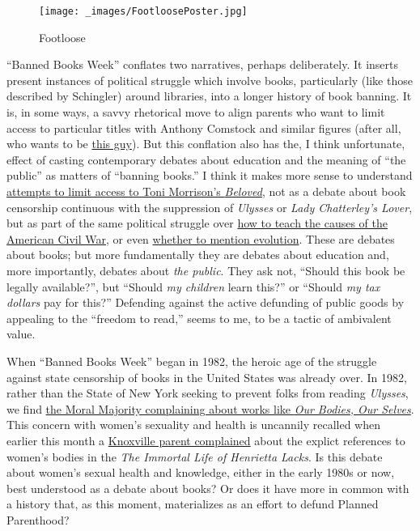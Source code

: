 \documentclass[
  12pt,
]{article}
\begin{document}
\par\begin{figure}\centering\texttt{[image: \_images/FootloosePoster.jpg]}\caption{Footloose}\end{figure}

``Banned Books Week'' conflates two narratives, perhaps deliberately. It
inserts present instances of political struggle which involve books,
particularly (like those described by Schingler) around libraries, into
a longer history of book banning. It is, in some ways, a savvy
rhetorical move to align parents who want to limit access to particular
titles with Anthony Comstock and similar figures (after all, who wants
to be \href{https://www.youtube.com/watch?v=20jbY6awlTw}{this guy}). But
this conflation also has the, I think unfortunate, effect of casting
contemporary debates about education and the meaning of ``the public''
as matters of ``banning books.'' I think it makes more sense to
understand
\href{http://bannedbooks.world.edu/2012/01/22/banned-books-awareness-beloved/}{attempts
to limit access to Toni Morrison's \emph{Beloved}}, not as a debate
about book censorship continuous with the suppression of \emph{Ulysses}
or \emph{Lady Chatterley's Lover}, but as part of the same political
struggle over
\href{https://www.washingtonpost.com/opinions/whitewashing-civil-war-history-for-young-minds/2015/07/06/1168226c-2415-11e5-b77f-eb13a215f593_story.html}{how
to teach the causes of the American Civil War}, or even
\href{http://www.nytimes.com/2013/11/23/education/texas-education-board-flags-biology-textbook-over-evolution-concerns.html}{whether
to mention evolution}. These are debates about books; but more
fundamentally they are debates about education and, more importantly,
debates about \emph{the public}. They ask not, ``Should this book be
legally available?'', but ``Should \emph{my children} learn this?'' or
``Should \emph{my tax dollars} pay for this?'' Defending against the
active defunding of public goods by appealing to the ``freedom to
read,'' seems to me, to be a tactic of ambivalent value.

When ``Banned Books Week'' began in 1982, the heroic age of the struggle
against state censorship of books in the United States was already over.
In 1982, rather than the State of New York seeking to prevent folks from
reading \emph{Ulysses}, we find
\href{https://news.google.com/newspapers?id=9CsdAAAAIBAJ\&sjid=RqUEAAAAIBAJ\&pg=6717\%2C5959414}{the
Moral Majority complaining about works like \emph{Our Bodies, Our
Selves}}. This concern with women's sexuality and health is uncannily
recalled when earlier this month a
\href{http://www.wbir.com/story/news/local/2015/09/07/local-mom-objects--controversial-book--summer-reading-list/71843596/}{Knoxville
parent complained} about the explict references to women's bodies in the
\emph{The Immortal Life of Henrietta Lacks}. Is this debate about
women's sexual health and knowledge, either in the early 1980s or now,
best understood as a debate about books? Or does it have more in common
with a history that, as this moment, materializes as an effort to defund
Planned Parenthood?
\end{document}
